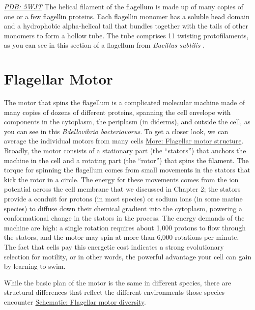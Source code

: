 \documentclass[]{tufte-book}
\begin{document}
\href{http://rcsb.org/structure/5WJT}{\emph{PDB: 5WJT}}
The helical filament of the flagellum is made up of many copies of one or a few flagellin proteins. Each flagellin monomer has a soluble head domain and a hydrophobic alpha-helical tail that bundles together with the tails of other monomers to form a hollow tube. The tube comprises 11 twisting protofilaments, as you can see in this section of a flagellum from \emph{Bacillus subtilis} \citep{wang2017}.

\hypertarget{flagellar-motor}{%
\section{Flagellar Motor}\label{flagellar-motor}}

The motor that spins the flagellum is a complicated molecular machine made of many copies of dozens of different proteins, spanning the cell envelope with components in the cytoplasm, the periplasm (in diderms), and outside the cell, as you can see in this \emph{Bdellovibrio bacteriovorus}. To get a closer look, we can average the individual motors from many cells \protect\hyperlink{Flagellar_motor_structure}{More: Flagellar motor structure}. Broadly, the motor consists of a stationary part (the ``stators'') that anchors the machine in the cell and a rotating part (the ``rotor'') that spins the filament. The torque for spinning the flagellum comes from small movements in the stators that kick the rotor in a circle. The energy for these movements comes from the ion potential across the cell membrane that we discussed in Chapter 2; the stators provide a conduit for protons (in most species) or sodium ions (in some marine species) to diffuse down their chemical gradient into the cytoplasm, powering a conformational change in the stators in the process. The energy demands of the machine are high: a single rotation requires about 1,000 protons to flow through the stators, and the motor may spin at more than 6,000 rotations per minute. The fact that cells pay this energetic cost indicates a strong evolutionary selection for motility, or in other words, the powerful advantage your cell can gain by learning to swim.

While the basic plan of the motor is the same in different species, there are structural differences that reflect the different environments those species encounter \protect\hyperlink{Flagellar_motor_diversity}{Schematic: Flagellar motor diversity}.



\hypertarget{htmlwidget-57106beef1b046fe70c1}{}
\end{document}
